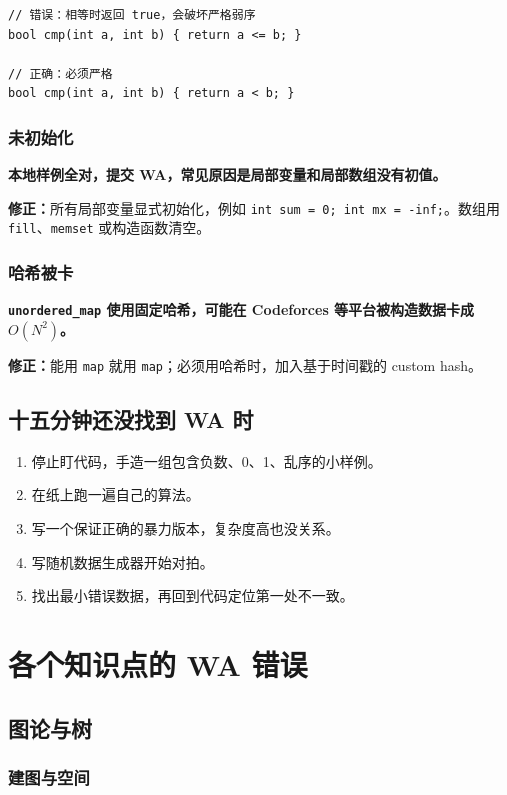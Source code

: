 \documentclass[UTF8,openany,oneside,zihao=-4]{ctexbook}
\newcommand{\risk}[1]{%
  \vspace{0.35em}
  \noindent\colorbox{softred}{%
    \parbox{\dimexpr\linewidth-2\fboxsep}{\textcolor{danger}{\textbf{#1}}}}%
  \vspace{0.35em}
}
\newcommand{\fix}[1]{%
  \vspace{0.35em}
  \noindent\colorbox{softgreen}{%
    \parbox{\dimexpr\linewidth-2\fboxsep}{\textbf{修正：}#1}}%
  \vspace{0.35em}
}
\begin{document}
\begin{lstlisting}
// 错误：相等时返回 true，会破坏严格弱序
bool cmp(int a, int b) { return a <= b; }

// 正确：必须严格
bool cmp(int a, int b) { return a < b; }
\end{lstlisting}

\subsection{未初始化}
\risk{本地样例全对，提交 WA，常见原因是局部变量和局部数组没有初值。}

\fix{所有局部变量显式初始化，例如 \texttt{int sum = 0; int mx = -inf;}。数组用 \texttt{fill}、\texttt{memset} 或构造函数清空。}

\subsection{哈希被卡}
\risk{\texttt{unordered\_map} 使用固定哈希，可能在 Codeforces 等平台被构造数据卡成 $O(N^2)$。}

\fix{能用 \texttt{map} 就用 \texttt{map}；必须用哈希时，加入基于时间戳的 custom hash。}

\section{十五分钟还没找到 WA 时}

\begin{enumerate}
  \item 停止盯代码，手造一组包含负数、0、1、乱序的小样例。
  \item 在纸上跑一遍自己的算法。
  \item 写一个保证正确的暴力版本，复杂度高也没关系。
  \item 写随机数据生成器开始对拍。
  \item 找出最小错误数据，再回到代码定位第一处不一致。
\end{enumerate}

\chapter{各个知识点的 WA 错误}

\section{图论与树}

\subsection{建图与空间}
\end{document}
